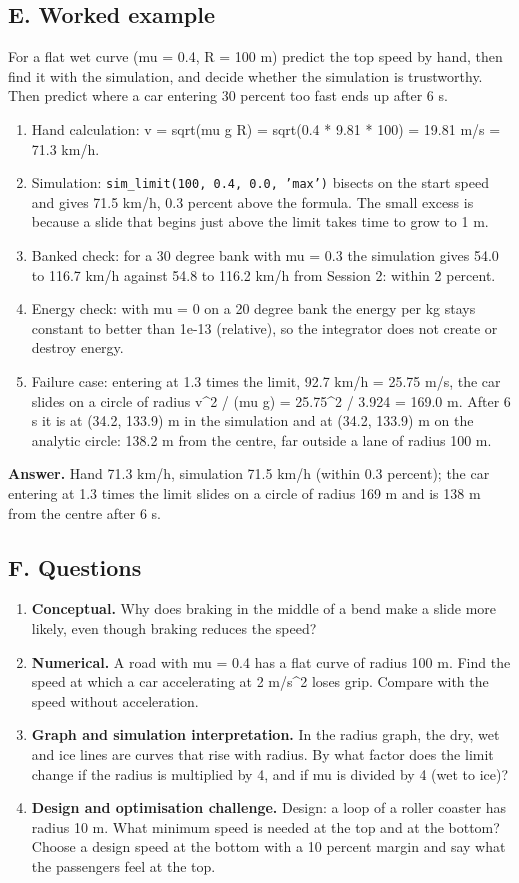 \documentclass[11pt,a4paper]{article}
\begin{document}
\subsection*{E. Worked example}
For a flat wet curve (mu = 0.4, R = 100 m) predict the top speed by hand, then find it with the simulation, and decide whether the simulation is trustworthy. Then predict where a car entering 30 percent too fast ends up after 6 s.
\begin{enumerate}[nosep]
\item Hand calculation: v = sqrt(mu g R) = sqrt(0.4 * 9.81 * 100) = 19.81 m/s = 71.3 km/h.
\item Simulation: \texttt{sim\_limit(100, 0.4, 0.0, 'max')} bisects on the start speed and gives 71.5 km/h, 0.3 percent above the formula. The small excess is because a slide that begins just above the limit takes time to grow to 1 m.
\item Banked check: for a 30 degree bank with mu = 0.3 the simulation gives 54.0 to 116.7 km/h against 54.8 to 116.2 km/h from Session 2: within 2 percent.
\item Energy check: with mu = 0 on a 20 degree bank the energy per kg stays constant to better than 1e-13 (relative), so the integrator does not create or destroy energy.
\item Failure case: entering at 1.3 times the limit, 92.7 km/h = 25.75 m/s, the car slides on a circle of radius v\textasciicircum{}2 / (mu g) = 25.75\textasciicircum{}2 / 3.924 = 169.0 m. After 6 s it is at (34.2, 133.9) m in the simulation and at (34.2, 133.9) m on the analytic circle: 138.2 m from the centre, far outside a lane of radius 100 m.
\end{enumerate}
\textbf{Answer.} Hand 71.3 km/h, simulation 71.5 km/h (within 0.3 percent); the car entering at 1.3 times the limit slides on a circle of radius 169 m and is 138 m from the centre after 6 s.

\subsection*{F. Questions}
\begin{enumerate}[nosep]
\item \textbf{Conceptual.} Why does braking in the middle of a bend make a slide more likely, even though braking reduces the speed?
\item \textbf{Numerical.} A road with mu = 0.4 has a flat curve of radius 100 m. Find the speed at which a car accelerating at 2 m/s\textasciicircum{}2 loses grip. Compare with the speed without acceleration.
\item \textbf{Graph and simulation interpretation.} In the radius graph, the dry, wet and ice lines are curves that rise with radius. By what factor does the limit change if the radius is multiplied by 4, and if mu is divided by 4 (wet to ice)?
\item \textbf{Design and optimisation challenge.} Design: a loop of a roller coaster has radius 10 m. What minimum speed is needed at the top and at the bottom? Choose a design speed at the bottom with a 10 percent margin and say what the passengers feel at the top.
\end{enumerate}
\end{document}
